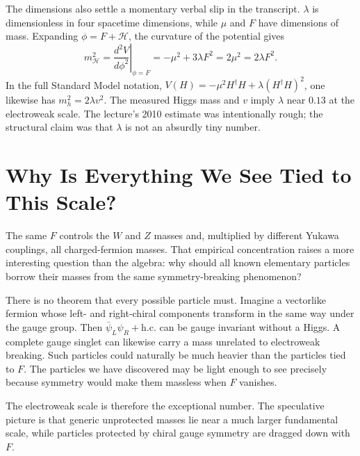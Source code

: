 The dimensions also settle a momentary verbal slip in the transcript.
\(\lambda\) is dimensionless in four spacetime dimensions, while \(\mu\)
and \(F\) have dimensions of mass. Expanding \(\phi=F+\mathcal H\), the
curvature of the potential gives
\begin{equation}
  m_{\mathcal H}^2
  =
  \left.\frac{d^2V}{d\phi^2}\right|_{\phi=F}
  =
  -\mu^2+3\lambda F^2
  =
  2\mu^2
  =
  2\lambda F^2.
  \label{eq:l10-higgs-curvature}
\end{equation}
In the full Standard Model notation,
\(V(H)=-\mu^2H^\dagger H+\lambda(H^\dagger H)^2\), one likewise has
\(m_h^2=2\lambda v^2\). The measured Higgs mass and \(v\) imply
\(\lambda\) near \(0.13\) at the electroweak scale. The lecture's 2010
estimate was intentionally rough; the structural claim was that
\(\lambda\) is not an absurdly tiny number.

\section{Why Is Everything We See Tied to This Scale?}

The same \(F\) controls the \(W\) and \(Z\) masses and, multiplied by
different Yukawa couplings, all charged-fermion masses. That empirical
concentration raises a more interesting question than the algebra:
why should all known elementary particles borrow their masses from the
same symmetry-breaking phenomenon?

There is no theorem that every possible particle must. Imagine a
vectorlike fermion whose left- and right-chiral components transform in the
same way under the gauge group. Then
\(\bar\psi_L\psi_R+\mathrm{h.c.}\) can be gauge invariant without a Higgs.
A complete gauge singlet can likewise carry a mass unrelated to
electroweak breaking. Such particles could naturally be much heavier than
the particles tied to \(F\). The particles we have discovered may be light
enough to see precisely because symmetry would make them massless when
\(F\) vanishes.

The electroweak scale is therefore the exceptional number. The speculative
picture is that generic unprotected masses lie near a much larger
fundamental scale, while particles protected by chiral gauge symmetry are
dragged down with \(F\).

\begin{classroomqa}
\end{classroomqa}

